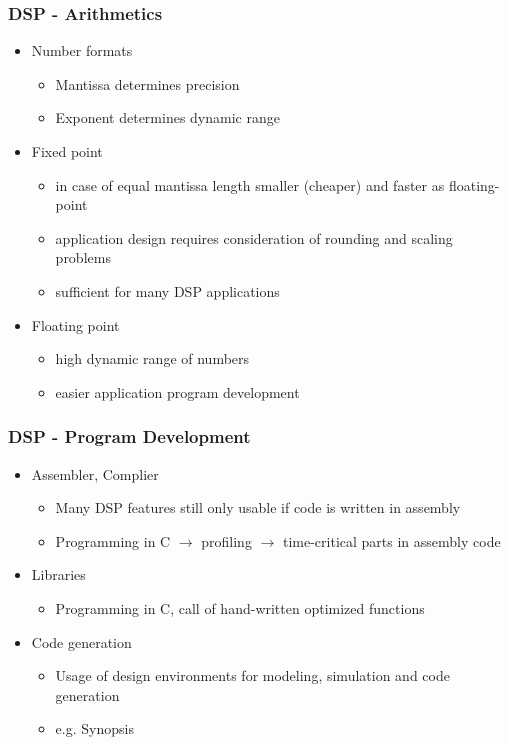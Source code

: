 \subsubsection{DSP - Arithmetics}
\begin{itemize}
	\item Number formats
		\begin{itemize}
			\item Mantissa determines precision
			\item Exponent determines dynamic range
		\end{itemize}
	\item Fixed point
		\begin{itemize}
			\item in case of equal mantissa length smaller (cheaper) and faster as floating-point
			\item application design requires consideration of rounding and scaling problems
			\item sufficient for many DSP applications 
		\end{itemize}
		\item Floating point
		\begin{itemize}
			\item high dynamic range of numbers
			\item easier application program development 
		\end{itemize}
\end{itemize}

\subsubsection{DSP - Program Development}
\begin{itemize}
	\item Assembler, Complier
	\begin{itemize}
		\item Many DSP features still only usable if code is written in assembly
		\item Programming in C $\rightarrow$ profiling $\rightarrow$ time-critical parts in assembly code
	\end{itemize}
	\item Libraries
	\begin{itemize}
		\item Programming in C, call of hand-written optimized functions
	\end{itemize}
	\item Code generation
	\begin{itemize}
		\item Usage of design environments for modeling, simulation and code generation
		\item e.g. Synopsis
	\end{itemize}
\end{itemize}

